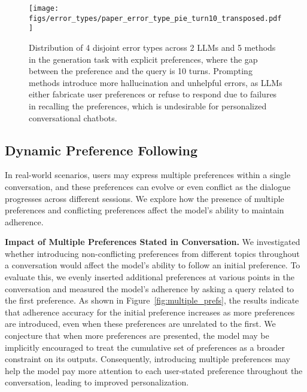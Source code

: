 \begin{figure}[h]
    \centering
    \begin{minipage}{0.51\textwidth}
         \texttt{[image: figs/error\_types/paper\_error\_type\_pie\_turn10\_transposed.pdf]}
           
    \end{minipage}
\begin{minipage}{0.47\textwidth}
\caption{Distribution of 4 disjoint error types across 2 LLMs and 5 methods in the generation task with explicit preferences, where the gap between the preference and the query is 10 turns. Prompting methods introduce more hallucination and unhelpful errors, as LLMs either fabricate user preferences or refuse to respond due to failures in recalling the preferences, which is undesirable for personalized conversational chatbots.}  
  \label{fig:errortype_10}
\end{minipage}

\end{figure}



\subsection{Dynamic Preference Following}
\label{sec: dynamic_prefs}
In real-world scenarios, users may express multiple preferences within a single conversation, and these preferences can evolve or even conflict as the dialogue progresses across different sessions. We explore how the presence of multiple preferences and conflicting preferences affect the model’s ability to maintain adherence.

\textbf{Impact of Multiple Preferences Stated in Conversation.} We investigated whether introducing non-conflicting preferences from different topics throughout a conversation would affect the model's ability to follow an initial preference. To evaluate this, we evenly inserted additional preferences at various points in the conversation and measured the model's adherence by asking a query related to the first preference. As shown in Figure~\ref{fig:multiple_prefs}, the results indicate that adherence accuracy for the initial preference increases as more preferences are introduced, even when these preferences are unrelated to the first. We conjecture that when more preferences are presented, the model may be implicitly encouraged to treat the cumulative set of preferences as a broader constraint on its outputs. Consequently, introducing multiple preferences may help the model pay more attention to each user-stated preference throughout the conversation, leading to improved personalization.

